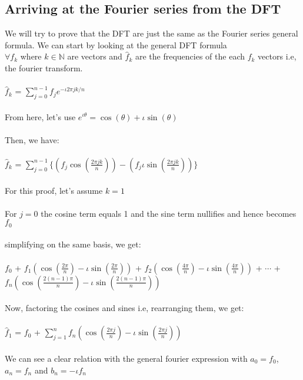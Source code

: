 \documentclass{article}
\begin{document}
\subsection{Arriving at the Fourier series from the DFT}
We will try to prove that the DFT are just the same as the Fourier series general formula. We can start by looking at the general DFT formula\\
$\forall f_{k} $ where $k \in \mathbb{N}$ are vectors and $\hat{f}_{k} $ are the frequencies of the each $f_{k}$ vectors i.e, the fourier transform.\\
\\
$\hat{f}_{k}$ = $\displaystyle \sum_{j = 0}^{n - 1} f_{j} e^{-\iota 2 \pi j k / n}$\\
\\
From here, let's use $e^{\iota \theta} = \cos(\theta) + \iota \sin(\theta)$\\
\\
Then, we have:\\
\\
$\hat{f}_{k} $ = $\displaystyle \sum_{j = 0}^{n - 1} \{ (f_{j} \cos(\frac{2 \pi j k} {n})) - (f_{j} \iota \sin(\frac{2 \pi j k}{n})) \} $\\
\\
For this proof, let's assume $k = 1$\\
\\
For $j = 0$ the cosine term equals 1 and the sine term nullifies and hence becomes $f_{0}$\\
\\
simplifying on the same basis, we get:\\
\\
$f_{0}$ + $ f_{1}(\cos(\frac{2 \pi}{n}) - \iota \sin(\frac{2 \pi}{n})) $ + $f_{2} (\cos(\frac{4 \pi}{n}) - \iota \sin(\frac{4 \pi}{n}))$ + $ \cdots $
 + $f_{n}(\cos(\frac{2 (n - 1) \pi }{n}) - \iota \sin(\frac{2 (n - 1) \pi }{n}))$\\
 \\
 Now, factoring the cosines and sines i.e, rearranging them, we get:\\
 \\
 $\hat{f}_{1}$ = $f_{0}$ + $\displaystyle \sum_{j = 1}^{n} f_{n}(\cos(\frac{2 \pi j}{n}) - \iota \sin(\frac{2 \pi j}{n}))$\\
 \\
 We can see a clear relation with the general fourier expression with $a_{0} = f_{0}$, $a_{n} = f_{n}$ and $b_{n} = - \iota f_{n}$\\
 \\
\end{document}
